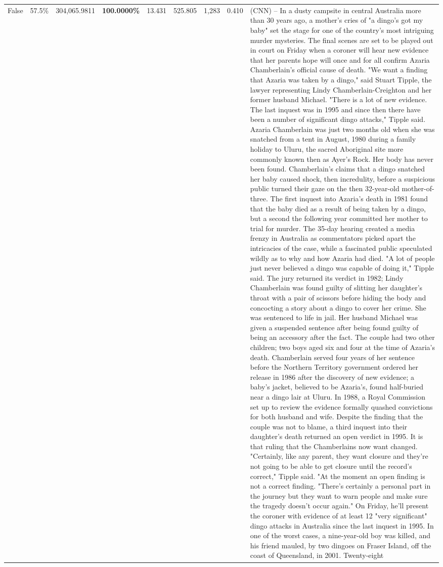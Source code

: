 \begin{table}[H]
\begin{tabular}{lllrlllll}
False & 57.5\% & \color{red} 304,065.9811 & \bfseries \color{red} 100.0000\% & 13.431 & 525.805 & 1,283 & 0.410 & (CNN) -- In a dusty campsite in central Australia more than 30 years ago, a mother's cries of "a dingo's got my baby" set the stage for one of the country's most intriguing murder mysteries. The final scenes are set to be played out in court on Friday when a coroner will hear new evidence that her parents hope will once and for all confirm Azaria Chamberlain's official cause of death. "We want a finding that Azaria was taken by a dingo," said Stuart Tipple, the lawyer representing Lindy Chamberlain-Creighton and her former husband Michael. "There is a lot of new evidence. The last inquest was in 1995 and since then there have been a number of significant dingo attacks," Tipple said. Azaria Chamberlain was just two months old when she was snatched from a tent in August, 1980 during a family holiday to Uluru, the sacred Aboriginal site more commonly known then as Ayer's Rock. Her body has never been found. Chamberlain's claims that a dingo snatched her baby caused shock, then incredulity, before a suspicious public turned their gaze on the then 32-year-old mother-of-three. The first inquest into Azaria's death in 1981 found that the baby died as a result of being taken by a dingo, but a second the following year committed her mother to trial for murder. The 35-day hearing created a media frenzy in Australia as commentators picked apart the intricacies of the case, while a fascinated public speculated wildly as to why and how Azaria had died. "A lot of people just never believed a dingo was capable of doing it," Tipple said. The jury returned its verdict in 1982; Lindy Chamberlain was found guilty of slitting her daughter's throat with a pair of scissors before hiding the body and concocting a story about a dingo to cover her crime. She was sentenced to life in jail. Her husband Michael was given a suspended sentence after being found guilty of being an accessory after the fact. The couple had two other children; two boys aged six and four at the time of Azaria's death. Chamberlain served four years of her sentence before the Northern Territory government ordered her release in 1986 after the discovery of new evidence; a baby's jacket, believed to be Azaria's, found half-buried near a dingo lair at Uluru. In 1988, a Royal Commission set up to review the evidence formally quashed convictions for both husband and wife. Despite the finding that the couple was not to blame, a third inquest into their daughter's death returned an open verdict in 1995. It is that ruling that the Chamberlains now want changed. "Certainly, like any parent, they want closure and they're not going to be able to get closure until the record's correct," Tipple said. "At the moment an open finding is not a correct finding. "There's certainly a personal part in the journey but they want to warn people and make sure the tragedy doesn't occur again." On Friday, he'll present the coroner with evidence of at least 12 "very significant" dingo attacks in Australia since the last inquest in 1995. In one of the worst cases, a nine-year-old boy was killed, and his friend mauled, by two dingoes on Fraser Island, off the coast of Queensland, in 2001. Twenty-eight 
\end{tabular}
\end{table}
